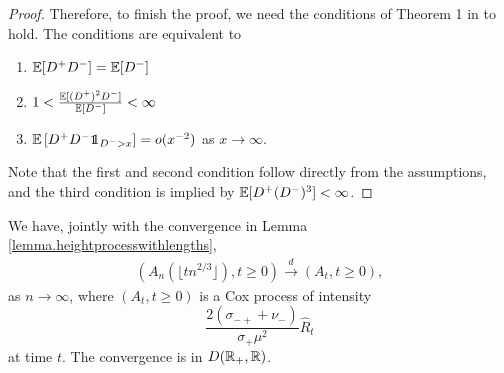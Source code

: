 \begin{proof}
Therefore, to finish the proof, we need the conditions of Theorem 1 in \cite{deraphelisScalingLimitMultitype2017} to hold. The conditions are equivalent to 
\begin{enumerate}
    \item ${\mathbb E}[D^+D^-]={\mathbb E}[D^-]$
    \item $1<\frac{{\mathbb E}[(D^+)^2D^-]}{{\mathbb E}[D^-]}<\infty$
    \item $\E\left[D^+D^-\one_{D^->x}\right]=o(x^{-2})$ as $x\to \infty$. 
\end{enumerate}
Note that the first and second condition follow directly from the assumptions, and the third condition is implied by ${\mathbb E}[D^+(D^-)^3]<\infty$.
\end{proof}



\begin{proposition}\label{prop.convergenceancestraledges}
We have, jointly with the convergence in Lemma \ref{lemma.heightprocesswithlengths},
\begin{align*}\left(A_n\left(\lfloor tn^{2/3}\rfloor\right),t\geq 0\right)\overset{d}{\to}\left(A_t,t\geq 0\right),\end{align*}
as $n\to \infty$, where $(A_t,t\geq 0)$ is a Cox process of intensity $$\frac{2(\sigma_{-+}+\nu_-)}{\sigma_+\mu^2} \hat{R}_t$$ at time $t$. The convergence is in $D({\mathbb R}_+,{\mathbb R})$.
\end{proposition}



